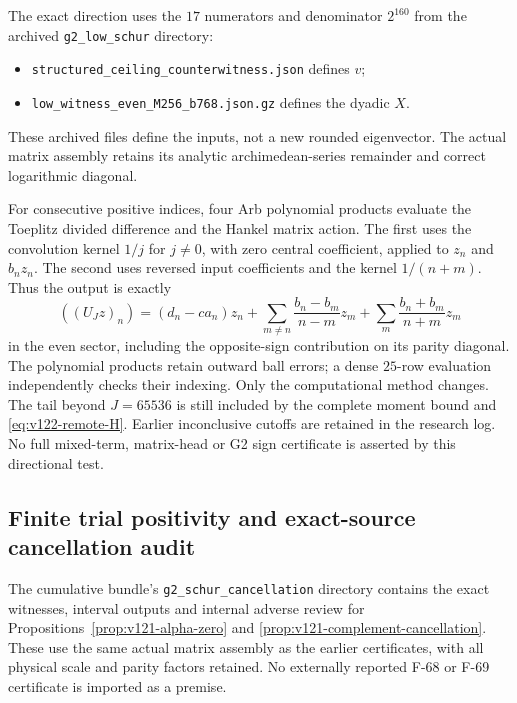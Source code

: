 \documentclass[11pt]{article}
\theoremstyle{remark}
\begin{document}
The exact direction uses the $17$ numerators and denominator $2^{160}$
from the archived \texttt{g2\_low\_schur} directory:
\begin{itemize}[nosep]
\item \nolinkurl{structured_ceiling_counterwitness.json} defines $v$;
\item \nolinkurl{low_witness_even_M256_b768.json.gz} defines the dyadic $X$.
\end{itemize}
These archived files define the inputs, not a new rounded eigenvector.
The actual matrix assembly retains its analytic archimedean-series
remainder and correct logarithmic diagonal.

For consecutive positive indices, four Arb polynomial products
evaluate the Toeplitz divided difference and the Hankel matrix action.
The first uses the convolution kernel $1/j$ for $j\ne0$, with zero
central coefficient, applied to $z_n$ and $b_nz_n$. The second
uses reversed input coefficients and the kernel $1/(n+m)$.
Thus the output is exactly
\[
 ((U_Jz)_n)=(d_n-ca_n)z_n+
 \sum_{m\ne n}\frac{b_n-b_m}{n-m}z_m+
 \sum_m\frac{b_n+b_m}{n+m}z_m
\]
in the even sector, including the opposite-sign contribution on its
parity diagonal. The polynomial products retain outward ball errors;
a dense $25$-row evaluation independently checks their indexing.
Only the computational method changes. The tail beyond $J=65536$
is still included by the complete moment bound and
\eqref{eq:v122-remote-H}. Earlier inconclusive cutoffs are retained
in the research log. No full mixed-term, matrix-head or G2 sign
certificate is asserted by this directional test.

\subsection*{Finite trial positivity and exact-source cancellation audit}
\label{app:v121-audit}
The cumulative bundle's \texttt{g2\_schur\_cancellation} directory
contains the exact witnesses, interval outputs and internal adverse
review for Propositions~\ref{prop:v121-alpha-zero} and
\ref{prop:v121-complement-cancellation}. These use the same actual
matrix assembly as the earlier certificates, with all physical scale
and parity factors retained. No externally reported F-68 or F-69
certificate is imported as a premise.
\end{document}
